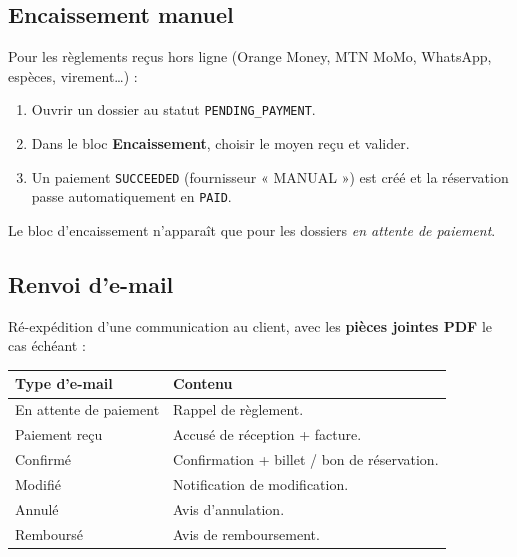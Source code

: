 \documentclass[11pt,a4paper]{article}
\newcommand{\etat}[1]{\textcolor{taNavy}{\texttt{#1}}}
\begin{document}
\subsection{Encaissement manuel}
Pour les règlements reçus hors ligne (Orange Money, MTN MoMo, WhatsApp, espèces, virement\dots) :
\begin{enumerate}[leftmargin=1.6em]
  \item Ouvrir un dossier au statut \etat{PENDING\_PAYMENT}.
  \item Dans le bloc \textbf{Encaissement}, choisir le moyen reçu et valider.
  \item Un paiement \etat{SUCCEEDED} (fournisseur « MANUAL ») est créé et la réservation passe
        automatiquement en \etat{PAID}.
\end{enumerate}
\begin{astuce}
Le bloc d'encaissement n'apparaît que pour les dossiers \textit{en attente de paiement}.
\end{astuce}

\subsection{Renvoi d'e-mail}
Ré-expédition d'une communication au client, avec les \textbf{pièces jointes PDF} le cas échéant :
\begin{center}
\begin{longtable}{>{\raggedright}p{5cm} p{8.2cm}}
\toprule
\textbf{Type d'e-mail} & \textbf{Contenu} \\
\midrule
\endhead
En attente de paiement & Rappel de règlement. \\
Paiement reçu & Accusé de réception + facture. \\
Confirmé & Confirmation + billet / bon de réservation. \\
Modifié & Notification de modification. \\
Annulé & Avis d'annulation. \\
Remboursé & Avis de remboursement. \\
\bottomrule
\end{longtable}
\end{center}
\end{document}
